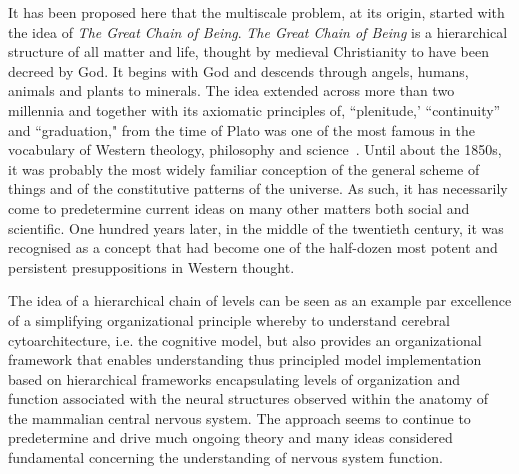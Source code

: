 \documentclass[10pt,letterpaper]{article}
\begin{document}
It has been proposed here that the multiscale problem, at its origin, started with the idea of {\it The Great Chain of Being}. {\it The Great Chain of Being} is a hierarchical structure of all matter and life, thought by medieval Christianity to have been decreed by God. It begins with God and descends through angels, humans, animals and plants to minerals. The idea extended across more than two millennia and together with its axiomatic principles of, ``plenitude,' ``continuity'' and ``graduation," from the time of Plato was one of the most famous in the vocabulary of Western theology, philosophy and science~\cite{lovejoy48}. Until about the 1850s, it was probably the most widely familiar conception of the general scheme of things and of the constitutive patterns of the universe. As such, it has necessarily come to predetermine current ideas on many other matters both social and scientific.  One hundred years later, in the middle of the twentieth century, it was recognised as a concept that had become one of the half-dozen most potent and persistent presuppositions in Western thought.

The idea of a hierarchical chain of levels can be seen as an example par excellence of a simplifying organizational principle whereby to understand cerebral cytoarchitecture, i.e. the cognitive model, but also provides an organizational framework that enables understanding thus principled model implementation based on hierarchical frameworks encapsulating levels of organization and function associated with the neural structures observed within the anatomy of the mammalian central nervous system. The approach seems to continue to predetermine and drive much ongoing theory and many ideas considered fundamental concerning the understanding of nervous system function.

\end{document}
